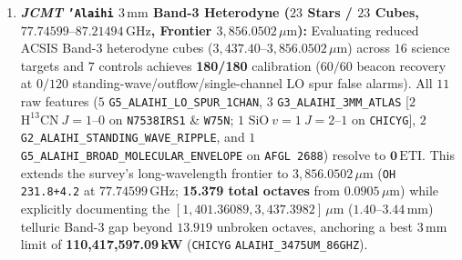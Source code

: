 \documentclass[twocolumn,10pt]{article}
\begin{document}
\begin{enumerate}
  \item \textbf{\textit{JCMT} \texttt{'Alaihi} $3\,\mathrm{mm}$ Band-3 Heterodyne ($23$ Stars / $23$ Cubes, $77.74599\text{--}87.21494\,\text{GHz}$, Frontier $3{,}856.0502\,\mu\text{m}$):} Evaluating reduced ACSIS Band-3 heterodyne cubes ($3{,}437.40\text{--}3{,}856.0502\,\mu\text{m}$) across $16$ science targets and $7$ controls achieves \textbf{180/180} calibration ($60/60$ beacon recovery at $0/120$ standing-wave/outflow/single-channel LO spur false alarms). All $11$ raw features ($5$ \texttt{G5\_\allowbreak ALAIHI\_\allowbreak LO\_\allowbreak SPUR\_\allowbreak 1CHAN}, $3$ \texttt{G3\_\allowbreak ALAIHI\_\allowbreak 3MM\_\allowbreak ATLAS} [$2$ $\mathrm{H^{13}CN}\ J=1\text{--}0$ on \texttt{N7538IRS1} \& \texttt{W75N}; $1$ $\mathrm{SiO}\ v=1\ J=2\text{--}1$ on \texttt{CHICYG}], $2$ \texttt{G2\_\allowbreak ALAIHI\_\allowbreak STANDING\_\allowbreak WAVE\_\allowbreak RIPPLE}, and $1$ \texttt{G5\_\allowbreak ALAIHI\_\allowbreak BROAD\_\allowbreak MOLECULAR\_\allowbreak ENVELOPE} on \texttt{AFGL\,2688}) resolve to $\mathbf{0\,\mathrm{ETI}}$. This extends the survey's long-wavelength frontier to $3{,}856.0502\,\mu\text{m}$ (\texttt{OH\,231.8+4.2} at $77.74599\,\text{GHz}$; \textbf{15.379 total octaves} from $0.0905\,\mu\text{m}$) while explicitly documenting the $[1{,}401.36089, 3{,}437.3982]\,\mu\text{m}$ ($1.40\text{--}3.44\,\text{mm}$) telluric Band-3 gap beyond $13.919$ unbroken octaves, anchoring a best $3\,\mathrm{mm}$ limit of \textbf{110,417,597.09\,kW} (\texttt{CHICYG} \texttt{ALAIHI\_\allowbreak 3475UM\_\allowbreak 86GHZ}).

\end{enumerate}
\end{document}
